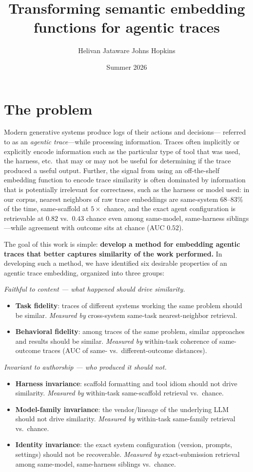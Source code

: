 \documentclass[10pt,twocolumn]{article}
\title{\vspace{-1.2em}\textbf{Transforming semantic embedding functions for agentic traces}}
\author{Helivan \quad Jataware \quad Johns Hopkins}
\date{Summer 2026}
\begin{document}
\maketitle

\section*{The problem}
Modern generative systems produce logs of their actions and decisions---
referred to as an \emph{agentic trace}---while processing information. Traces
often implicitly or explicitly encode information such as the particular type
of tool that was used, the harness, etc.\ that may or may not be useful for
determining if the trace produced a useful output. Further, the signal from
using an off-the-shelf embedding function to encode trace similarity is often
dominated by information that is potentially irrelevant for correctness, such
as the harness or model used: in our corpus, nearest neighbors of raw trace
embeddings are same-system 68--83\% of the time, same-scaffold at $5\times$
chance, and the exact agent configuration is retrievable at $0.82$ vs.\
$0.43$ chance even among same-model, same-harness siblings---while agreement
with outcome sits at chance (AUC $0.52$).

The goal of this work is simple: \textbf{develop a method for embedding
agentic traces that better captures similarity of the work performed.} In
developing such a method, we have identified six desirable properties of an
agentic trace embedding, organized into three groups:

\smallskip
\noindent\emph{Faithful to content --- what happened should drive similarity.}
\begin{itemize}[leftmargin=1.2em,itemsep=1pt,topsep=1pt]
  \item \textbf{Task fidelity}: traces of different systems working the same
  problem should be similar. \emph{Measured by} cross-system same-task
  nearest-neighbor retrieval.
  \item \textbf{Behavioral fidelity}: among traces of the same problem,
  similar approaches and results should be similar. \emph{Measured by}
  within-task coherence of same-outcome traces (AUC of same- vs.\
  different-outcome distances).
\end{itemize}

\noindent\emph{Invariant to authorship --- who produced it should not.}
\begin{itemize}[leftmargin=1.2em,itemsep=1pt,topsep=1pt]
  \item \textbf{Harness invariance}: scaffold formatting and tool idiom
  should not drive similarity. \emph{Measured by} within-task same-scaffold
  retrieval vs.\ chance.
  \item \textbf{Model-family invariance}: the vendor/lineage of the
  underlying LLM should not drive similarity. \emph{Measured by} within-task
  same-family retrieval vs.\ chance.
  \item \textbf{Identity invariance}: the exact system configuration
  (version, prompts, settings) should not be recoverable. \emph{Measured by}
  exact-submission retrieval among same-model, same-harness siblings vs.\
  chance.
\end{itemize}
\end{document}
